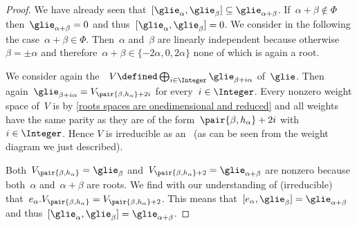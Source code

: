 \begin{proof}
  We have already seen that~$[\glie_\alpha, \glie_\beta] \subseteq \glie_{\alpha + \beta}$.
  If~$\alpha+\beta \notin \Phi$ then~$\glie_{\alpha + \beta} = 0$ and thus~$[\glie_\alpha, \glie_\beta] = 0$.
  We consider in the following the case~$\alpha + \beta \in \Phi$.
  Then~$\alpha$ and~$\beta$ are linearly independent because otherwise~$\beta = \pm \alpha$ and therefore~$\alpha + \beta \in \{-2 \alpha, 0, 2 \alpha\}$ none of which is again a root.
  
  We consider again the~{}~$V \defined \bigoplus_{i \in \Integer} \glie_{\beta + i\alpha}$ of~$\glie$.
  Then again~$\glie_{\beta + i\alpha} = V_{\pair{\beta, h_\alpha}+2i}$ for every~$i \in \Integer$.
  Every nonzero weight space of~$V$ is {\onedimensional} by \cref{roots spaces are onedimensional and reduced} and all weights have the same parity as they are of the form~$\pair{\beta, h_\alpha} + 2i$ with~$i \in \Integer$.
  Hence $V$ is irreducible as an~{} (as can be seen from the weight diagram we just described).
  
  Both~$V_{\pair{\beta, h_\alpha}} = \glie_\beta$ and~$V_{\pair{\beta, h_\alpha}+2} = \glie_{\alpha+\beta}$ are nonzero because both~$\alpha$ and~$\alpha+\beta$ are roots.
  We find with our understanding of (irreducible)~{} that~$e_\alpha.V_{\pair{\beta, h_\alpha}} = V_{\pair{\beta, h_\alpha}+2}$.
  This means that~$[e_\alpha, \glie_\beta] = \glie_{\alpha+\beta}$ and thus~$[\glie_\alpha, \glie_\beta] = \glie_{\alpha+\beta}$.
\end{proof}




